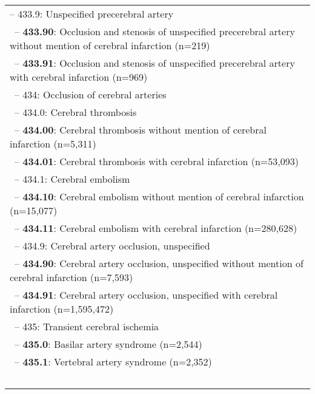 \begin{longtable}{p{\textwidth}}
\hspace{30pt}\footnotesize{-- 433.9: Unspecified precerebral artery} \\ \-\ \hspace{40pt}\footnotesize{-- {\color{ForestGreen} \textbf{433.90}}: Occlusion and stenosis of unspecified precerebral artery without mention of cerebral infarction (n=219)} \\ \-\ \hspace{40pt}\footnotesize{-- {\color{ForestGreen} \textbf{433.91}}: Occlusion and stenosis of unspecified precerebral artery with cerebral infarction (n=969)} \\ \-\ \hspace{20pt}\footnotesize{-- 434: Occlusion of cerebral arteries} \\ \-\ \hspace{30pt}\footnotesize{-- 434.0: Cerebral thrombosis} \\ \-\ \hspace{40pt}\footnotesize{-- {\color{ForestGreen} \textbf{434.00}}: Cerebral thrombosis without mention of cerebral infarction (n=5,311)} \\ \-\ \hspace{40pt}\footnotesize{-- {\color{ForestGreen} \textbf{434.01}}: Cerebral thrombosis with cerebral infarction (n=53,093)} \\ \-\ \hspace{30pt}\footnotesize{-- 434.1: Cerebral embolism} \\ \-\ \hspace{40pt}\footnotesize{-- {\color{ForestGreen} \textbf{434.10}}: Cerebral embolism without mention of cerebral infarction (n=15,077)} \\ \-\ \hspace{40pt}\footnotesize{-- {\color{ForestGreen} \textbf{434.11}}: Cerebral embolism with cerebral infarction (n=280,628)} \\ \-\ \hspace{30pt}\footnotesize{-- 434.9: Cerebral artery occlusion, unspecified} \\ \-\ \hspace{40pt}\footnotesize{-- {\color{ForestGreen} \textbf{434.90}}: Cerebral artery occlusion, unspecified without mention of cerebral infarction (n=7,593)} \\ \-\ \hspace{40pt}\footnotesize{-- {\color{ForestGreen} \textbf{434.91}}: Cerebral artery occlusion, unspecified with cerebral infarction (n=1,595,472)} \\ \-\ \hspace{20pt}\footnotesize{-- 435: Transient cerebral ischemia} \\ \-\ \hspace{30pt}\footnotesize{-- {\color{ForestGreen} \textbf{435.0}}: Basilar artery syndrome (n=2,544)} \\ \-\ \hspace{30pt}\footnotesize{-- {\color{ForestGreen} \textbf{435.1}}: Vertebral artery syndrome (n=2,352)} \\ \-\ \hspace{30pt}\footnotesize{-- 
\end{longtable}
